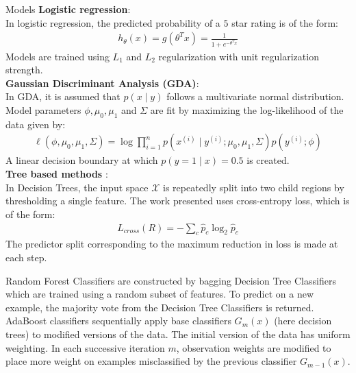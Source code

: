 \documentclass[final]{beamer}
\newlength{\secondcolwid}
\begin{document}
\begin{frame}[t]
\begin{columns}[t]
\begin{column}[t]{\secondcolwid}
\begin{block}{Models}
    {\color{cardinalred}\textbf{Logistic regression}:}\\ \noindent
    In logistic regression, the predicted probability of a $5$ star rating is of the form:
    \begin{align}
        h_\theta (x) = g(\theta^Tx) = \frac{1}{1 + e^{- \theta^T x}}
    \end{align}
    Models are trained using $L_1$ and $L_2$ regularization with unit regularization strength. \vspace{1em}
    \\ \noindent
    {\color{cardinalred}\textbf{Gaussian Discriminant Analysis (GDA)}:}\\ \noindent
    In GDA, it is assumed that $p(x \mid y)$ follows a multivariate normal distribution.
    Model parameters $\phi, \mu_0, \mu_1$ and $\Sigma$ are fit by maximizing the log-likelihood of the data given by:
    \begin{align}
        \ell(\phi, \mu_0, \mu_1, \Sigma) = \log \prod_{i=1}^n p(x^{(i)} \mid y^{(i)}; \mu_0, \mu_1, \Sigma) p(y^{(i)}; \phi)
    \end{align}
    A linear decision boundary at which $p(y = 1 \mid x) = 0.5$ is created. \\
    \vspace{1em}
    \noindent
    {\color{cardinalred}\textbf{Tree based methods} \cite{ESL}:} \\
    \noindent
    In Decision Trees, the input space $\mathcal{X}$ is repeatedly split into two child regions by thresholding a single feature. The work presented uses cross-entropy loss, which is of the form:
    \begin{align}
        L_{cross}(R) = - \sum_c \hat{p}_c \log_2 \hat{p}_c
    \end{align}
    The predictor split corresponding to the maximum reduction in loss is made at each step.
    
    Random Forest Classifiers are constructed by bagging Decision Tree Classifiers which are trained using a random subset of features. To predict on a new example, the majority vote from the Decision Tree Classifiers is returned.\vspace{0.5em}
    AdaBoost classifiers sequentially apply base classifiers $G_{m}(x)$ (here decision trees) to modified versions of the data. The initial version of the data has uniform weighting. In each successive iteration $m$, observation weights are modified to place more weight on examples misclassified by the previous classifier $G_{m-1}(x)$.
    \end{block}
	 

\end{column}
\end{columns}
\end{frame}
\end{document}
